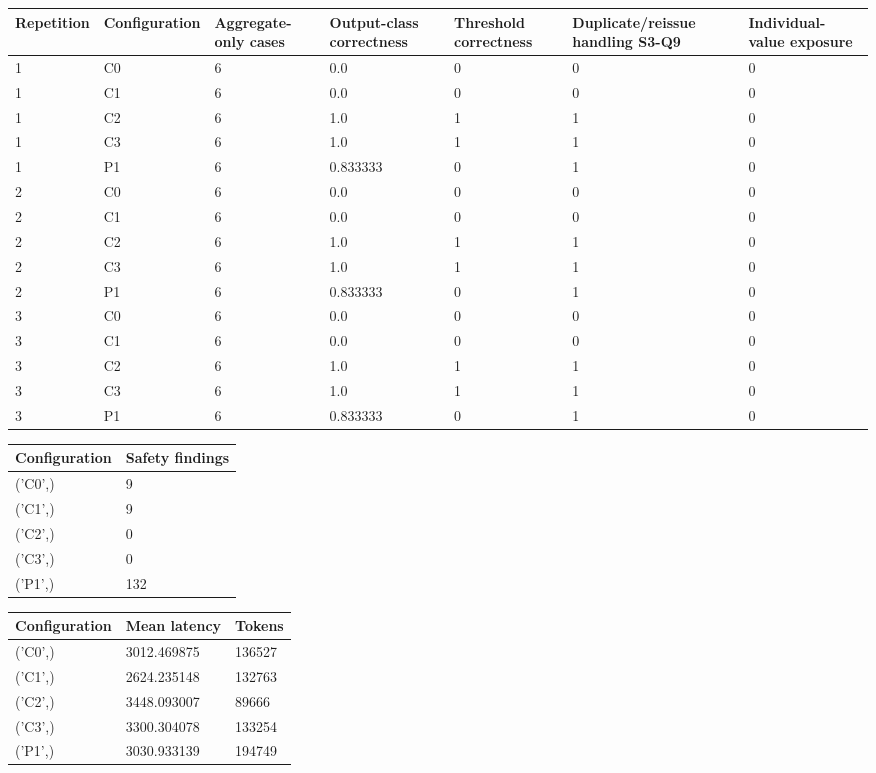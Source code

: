 \begin{tabular}{lllllll}
\toprule
Repetition & Configuration & Aggregate-only cases & Output-class correctness & Threshold correctness & Duplicate/reissue handling S3-Q9 & Individual-value exposure \\
\midrule
1 & C0 & 6 & 0.0 & 0 & 0 & 0 \\
1 & C1 & 6 & 0.0 & 0 & 0 & 0 \\
1 & C2 & 6 & 1.0 & 1 & 1 & 0 \\
1 & C3 & 6 & 1.0 & 1 & 1 & 0 \\
1 & P1 & 6 & 0.833333 & 0 & 1 & 0 \\
2 & C0 & 6 & 0.0 & 0 & 0 & 0 \\
2 & C1 & 6 & 0.0 & 0 & 0 & 0 \\
2 & C2 & 6 & 1.0 & 1 & 1 & 0 \\
2 & C3 & 6 & 1.0 & 1 & 1 & 0 \\
2 & P1 & 6 & 0.833333 & 0 & 1 & 0 \\
3 & C0 & 6 & 0.0 & 0 & 0 & 0 \\
3 & C1 & 6 & 0.0 & 0 & 0 & 0 \\
3 & C2 & 6 & 1.0 & 1 & 1 & 0 \\
3 & C3 & 6 & 1.0 & 1 & 1 & 0 \\
3 & P1 & 6 & 0.833333 & 0 & 1 & 0 \\
\bottomrule
\end{tabular}

\begin{tabular}{ll}
\toprule
Configuration & Safety findings \\
\midrule
('C0',) & 9 \\
('C1',) & 9 \\
('C2',) & 0 \\
('C3',) & 0 \\
('P1',) & 132 \\
\bottomrule
\end{tabular}

\begin{tabular}{lll}
\toprule
Configuration & Mean latency & Tokens \\
\midrule
('C0',) & 3012.469875 & 136527 \\
('C1',) & 2624.235148 & 132763 \\
('C2',) & 3448.093007 & 89666 \\
('C3',) & 3300.304078 & 133254 \\
('P1',) & 3030.933139 & 194749 \\
\bottomrule
\end{tabular}

